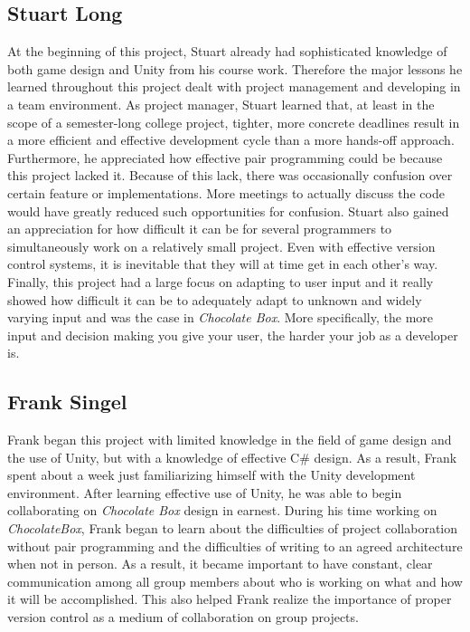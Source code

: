 \documentclass[pdftex,12pt,letter]{article}
\begin{document}
\begin{itemize}
\begin{itemize}
\begin{itemize}
\begin{itemize}
\subsection{Stuart Long}
At the beginning of this project, Stuart already had sophisticated knowledge of both game design and Unity from his course work. Therefore the major lessons he learned throughout this project dealt with project management and developing in a team environment. As project manager, Stuart learned that, at least in the scope of a semester-long college project, tighter, more concrete deadlines result in a more efficient and effective development cycle than a more hands-off approach. Furthermore, he appreciated how effective pair programming could be because this project lacked it. Because of this lack, there was occasionally confusion over certain feature or implementations. More meetings to actually discuss the code would have greatly reduced such opportunities for confusion. Stuart also gained an appreciation for how difficult it can be for several programmers to simultaneously work on a relatively small project. Even with effective version control systems, it is inevitable that they will at time get in each other's way. Finally, this project had a large focus on adapting to user input and it really showed how difficult it can be to adequately adapt to unknown and widely varying input and was the case in \textit{Chocolate Box}. More specifically, the more input and decision making you give your user, the harder your job as a developer is.
\subsection{Frank Singel}
Frank began this project with limited knowledge in the field of game design and the use of Unity, but with a knowledge of effective C\# design. As a result, Frank spent about a week just familiarizing himself with the Unity development environment. After learning effective use of Unity, he was able to begin collaborating on \textit{Chocolate Box} design in earnest. During his time working on \textit{ChocolateBox}, Frank began to learn about the difficulties of project collaboration without pair programming and the difficulties of writing to an agreed architecture when not in person. As a result, it became important to have constant, clear communication among all group members about who is working on what and how it will be accomplished. This also helped Frank realize the importance of proper version control as a medium of collaboration on group projects.


\end{itemize}
\end{itemize}
\end{itemize}
\end{itemize}
\end{document}

